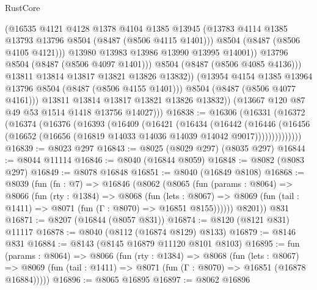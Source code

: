 \begin{lexlean}{RustCore}
\begin{coremodule}
                          (@16535
                            @4121
                            @4128
                            @1378
                            @4104
                            @1385
                            @13945
                            (@13783 @4114 @1385 @13793 @13796 @8504 (@8487 (@8506 @4115 @1401)))
                            @8504
                            (@8487 (@8506 @4105 @4121)))
                          @13980
                          @13983
                          @13986
                          @13990
                          @13995
                          @14001))
                      @13796
                      @8504
                      (@8487 (@8506 @4097 @1401)))
                    @8504
                    (@8487 (@8506 @4085 @4136)))
                  @13811
                  @13814
                  @13817
                  @13821
                  @13826
                  @13832))
              (@13954 @4154 @1385 @13964 @13796 @8504 (@8487 (@8506 @4155 @1401)))
              @8504
              (@8487 (@8506 @4077 @4161)))
            @13811
            @13814
            @13817
            @13821
            @13826
            @13832))
        (@13667 @120 @87 @49 @53 @1514 @1418 @13756 @14027)))
@16838 := @16306
    (@16331
      (@16372
        (@16374
          (@16376
            (@16393
              (@16409
                (@16421
                  (@16434
                    (@16442
                      (@16446
                        (@16456
                          (@16652 (@16656 (@16819 @14033 @14036 @14039 @14042 @9017))))))))))))))
@16839 := @8023 @297
@16843 := @8025 (@8029 @297) (@8035 @297)
@16844 := @8044 @11114
@16846 := @8040 (@16844 @8059)
@16848 := @8082 (@8083 @297)
@16849 := @8078 @16848
@16851 := @8040 (@16849 @8108)
@16868 := @8039
    (fun (fn : @7) =>
    @16846
      (@8062
        (@8065
          (fun (params : @8064) =>
          @8066
            (fun (rty : @1384) =>
            @8068
              (fun (lets : @8067) =>
              @8069 (fun (tail : @1411) => @8071 (fun (Γ : @8070) => @16851 @8155))))))
        @8201))
    @831
@16871 := @8207 (@16844 (@8057 @831))
@16874 := @8120 (@8121 @831) @11117
@16878 := @8040 (@8112 (@16874 @8129) @8133)
@16879 := @8146 @831
@16884 := @8143 (@8145 @16879 @11120 @8101 @8103)
@16895 := fun (params : @8064) =>
  @8066
    (fun (rty : @1384) =>
    @8068
      (fun (lets : @8067) =>
      @8069 (fun (tail : @1411) => @8071 (fun (Γ : @8070) => @16851 (@16878 @16884)))))
@16896 := @8065 @16895
@16897 := @8062 @16896

\end{coremodule}
\end{lexlean}
